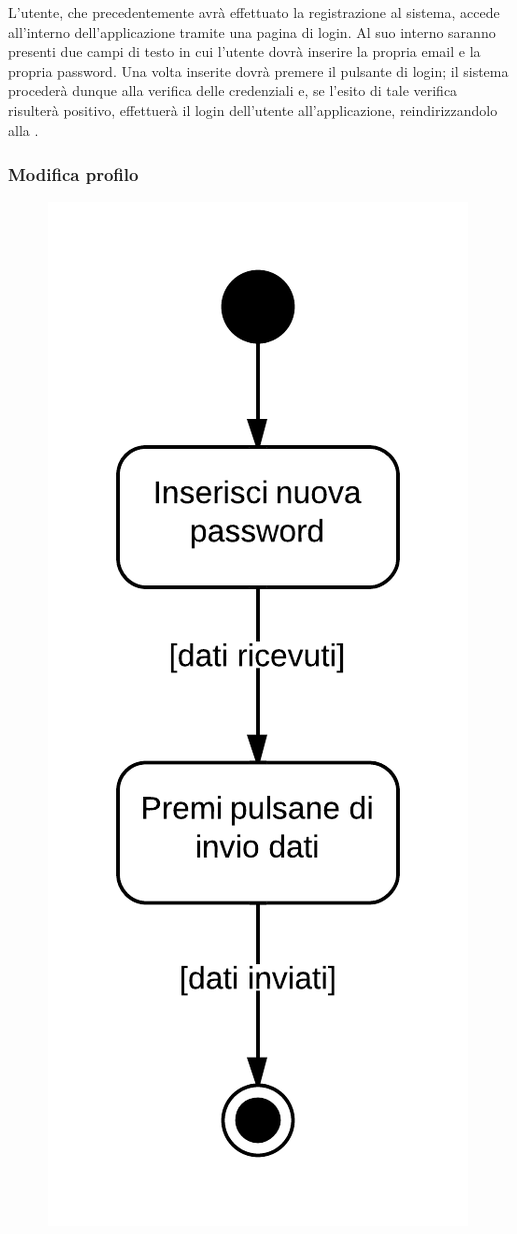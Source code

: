 L'utente, che precedentemente avrà effettuato la registrazione al sistema, accede all'interno dell'applicazione tramite una pagina di login. Al suo interno saranno presenti due campi di testo in cui l'utente dovrà inserire la propria email e la propria password. Una volta inserite dovrà premere il pulsante di login; il sistema  procederà dunque alla verifica delle credenziali e, se l'esito di tale verifica risulterà positivo, effettuerà il login dell'utente all'applicazione, reindirizzandolo alla .

\subsubsection{Modifica profilo}

\begin{figure}[H]
\centering
\includegraphics[scale=0.2]{uml/MaaP - Modifica profilo.png}

\end{figure}
